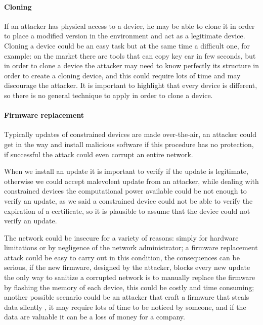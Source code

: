 	\paragraph{Cloning}
	If an attacker has physical access to a device, he may be able to clone it in order to place a modified version in the environment and act as a legitimate device.\newline
	Cloning a device could be an easy task but at the same time a difficult one, for example: on the market there are tools that can copy key car in few seconds, but in order to clone a device the attacker may need to know perfectly its structure in order to create a cloning device, and this could require lots of time and may discourage the attacker.\newline
	It is important to highlight that every device is different, so there is no general technique to apply in order to clone a device.\newline
	
	\paragraph{Firmware replacement}
	Typically updates of constrained devices are made over-the-air, an attacker could get in the way and install malicious software if this procedure has no protection, if successful the attack could even corrupt an entire network.\newline
	
	When we install an update it is important to verify if the update is legitimate, otherwise we could accept malevolent update from an attacker, while dealing with constrained devices the computational power available could be not enough to verify an update, as we said a constrained device could not be able to verify the expiration of a certificate, so it is plausible to assume that the device could not verify an update.\newline
	
	The network could be insecure for a variety of reasons: simply for hardware limitations or by negligence of the network administrator; a firmware replacement attack could be easy to carry out in this condition, the consequences can be serious, if the new firmware, designed by the attacker, blocks every new update the only way to sanitize a corrupted network is to manually replace the firmware by flashing the memory of each device, this could be costly and time consuming; another possible scenario could be an attacker that craft a firmware that steals data silently , it may require lots of time to be noticed by someone, and if the data are valuable it can be a loss of money for a company.\newline
	
